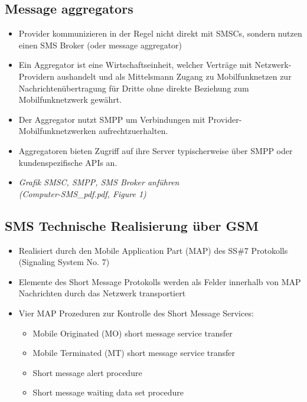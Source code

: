 \documentclass[german,12pt,a4paper]{article}
\begin{document}
\subsection{Message aggregators}
\begin{itemize}
	\item Provider kommunizieren in der Regel nicht direkt mit SMSCs, sondern nutzen einen SMS Broker (oder message aggregator)
	\item Ein Aggregator ist eine Wirtschaftseinheit, welcher Verträge mit Netzwerk-Providern aushandelt und als Mittelsmann
		Zugang zu Mobilfunknetzen zur Nachrichtenübertragung für Dritte ohne direkte Beziehung zum Mobilfunknetzwerk gewährt. 
	\item Der Aggregator nutzt SMPP um Verbindungen mit Provider-Mobilfunknetzwerken aufrechtzuerhalten.
	\item Aggregatoren bieten Zugriff auf ihre Server typischerweise über SMPP oder kundenspezifische APIs an.
	\item \textit{Grafik SMSC, SMPP, SMS Broker anführen \\(Computer-SMS\_pdf.pdf, Figure 1)}
\end{itemize}

\subsection{SMS Technische Realisierung über GSM}
\begin{itemize}
	\item Realisiert durch den Mobile Application Part (MAP) des SS\#7 Protokolls (Signaling System No. 7)
	\item Elemente des Short Message Protokolls werden als Felder innerhalb von MAP Nachrichten 
		durch das Netzwerk transportiert
	\item Vier MAP Prozeduren zur Kontrolle des Short Message Services:
		\begin{itemize}
			\item Mobile Originated (MO) short message service transfer
			\item Mobile Terminated (MT) short message service transfer
			\item Short message alert procedure
			\item Short message waiting data set procedure
		\end{itemize}
\end{itemize}
\end{document}

